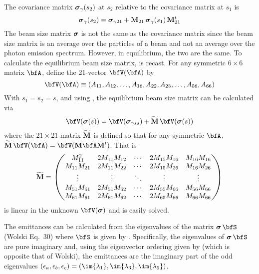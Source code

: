 The covariance matrix ${\boldsymbol{\sigma}}_\gamma(s_2)$ at $s_2$ relative to the covariance matrix at $s_1$ is
\begin{equation}
  {\boldsymbol{\sigma}}_\gamma(s_2) = {\boldsymbol{\sigma}}_{\gamma21} + {\bf M}_{21} \, {\boldsymbol{\sigma}}_\gamma(s_1) \, {\bf M}_{21}^t
  \label{ssmsm}
\end{equation}
The beam size matrix ${\boldsymbol{\sigma}}$ is not the same as the covariance matrix since the beam size matrix is
an average over the particles of a beam and not an average over the photon emission
spectrum. However, in equilibrium, the two are the same. To calculate the equilibrium beam size
matrix,  is recast. For any symmetric $6\times6$ matrix $\bfA$, define the 21-vector
$\bfV(\bfA)$ by
\begin{equation}
  \bfV(\bfA) \equiv (A_{11}, A_{12}, \ldots, A_{16}, A_{22}, A_{23}, \ldots, A_{56}, A_{66})
\end{equation}
With $s_1 = s_2 = s$, and using , the equilibrium beam size matrix can be calculated via
\begin{equation}
  \bfV(\bfsig(s)) = \bfV(\bfsig_{\gamma ss}) + \wt\bfM \, \bfV(\bfsig(s))
  \label{vsmv}
\end{equation}
where the $21\times21$ matrix $\widetilde{{\bf M}}$ is defined so that for any symmetric $\bfA$, $\wt\bfM \, \bfV(\bfA) =
\bfV(\bfM\bfA\bfM^t)$. That is
\begin{equation}
  \widetilde{{\bf M}} = \begin{pmatrix}
    M_{11}^2      & 2 M_{11} M_{12} & \cdots & 2 M_{15} M_{16} & M_{16} M_{16} \\
    M_{11} M_{21} & 2 M_{11} M_{22} & \cdots & 2 M_{15} M_{26} & M_{16} M_{26} \\
    \vdots        & \vdots          & \ddots & \vdots          & \vdots      \\
    M_{51} M_{61} & 2 M_{51} M_{62} & \cdots & 2 M_{55} M_{66} & M_{56} M_{66} \\
    M_{61} M_{61} & 2 M_{61} M_{62} & \cdots & 2 M_{65} M_{66} & M_{66} M_{66}
  \end{pmatrix}
\end{equation}
 is linear in the unknown $\bfV(\bfsig)$ and is easily solved.

The emittances can be calculated from the eigenvalues of the matrix $\bfsig \, \bfS$
(Wolski\cite{b:wolski.coupling} Eq.~30) where $\bfS$ is given by . Specifically, the
eigenvalues of $\bfsig \, \bfS$ are pure imaginary and, using the eigenvector ordering given by
 (which is opposite that of Wolski), the emittances are the imaginary part of the odd
eigenvalues $(\epsilon_a, \epsilon_b, \epsilon_c) = (\im{\lambda_1}, \im{\lambda_3}, \im{\lambda_5})$.

